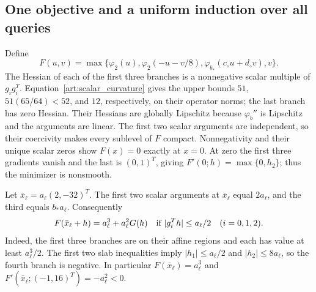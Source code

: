 \subsection{One objective and a uniform induction over all queries}
Define
\begin{equation}\label{art:upper_objective}
 F(u,v)=\max\{\varphi_2(u),\varphi_2(-u-v/8),
                    \varphi_{b_*}(c_\circ u+d_\circ v),v\}.
\end{equation}
The Hessian of each of the first three branches is a nonnegative scalar
multiple of $g_ig_i^T$. Equation~\eqref{art:scalar_curvature} gives the
upper bounds $51$, $51(65/64)<52$, and $12$, respectively, on their
operator norms; the last branch has zero Hessian. Their Hessians are
globally Lipschitz because $\varphi_b''$ is Lipschitz and the arguments
are linear. The first two scalar arguments are independent, so their
coercivity makes every sublevel of $F$ compact. Nonnegativity and their
unique scalar zeros show $F(x)=0$ exactly at $x=0$. At zero the first
three gradients vanish and the last is $(0,1)^T$, giving
$F'(0;h)=\max\{0,h_2\}$; thus the minimizer is nonsmooth.

Let $\bar x_\ell=a_\ell(2,-32)^T$. The first two scalar arguments at $\bar x_\ell$ equal
$2a_\ell$, and the third equals $b_*a_\ell$. Consequently
\begin{equation}\label{art:upper_local_model}
 F(\bar x_\ell+h)=a_\ell^3+a_\ell^2G(h)
 \quad\hbox{if } |g_i^Th|\le a_\ell/2\quad(i=0,1,2).
\end{equation}
Indeed, the first three branches are on their affine regions and each
has value at least $a_\ell^3/2$. The first two slab inequalities imply
$|h_1|\le a_\ell/2$ and $|h_2|\le8a_\ell$, so the fourth branch is negative.
In particular $F(\bar x_\ell)=a_\ell^3$ and
$F'(\bar x_\ell;(-1,16)^T)=-a_\ell^2<0$.


